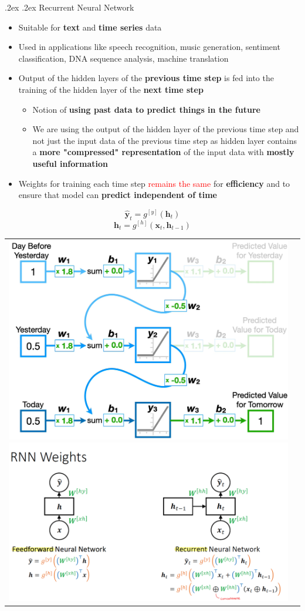 \documentclass[landscape,a4paper]{article}
\makeatletter
\renewcommand{\section}{\@startsection{section}{1}{0mm}%
	{.2ex}%
	{.2ex}%
	{\color{myblue}\sffamily\scriptsize\bfseries}}
\makeatother
\begin{document}
\begin{multicols*}{4}
	\section{Recurrent Neural Network}
	\begin{itemize}
		\item Suitable for \textbf{text} and \textbf{time series} data
		\item Used in applications like speech recognition, music generation, sentiment classification, DNA sequence analysis, machine translation
		\item Output of the hidden layers of the \textbf{previous time step} is fed into the training of the hidden layer of the \textbf{next time step}
		\begin{itemize}
			\item Notion of \textbf{using past data to predict things in the future}
			\item We are using the output of the hidden layer of the previous time step and not just the input data of the previous time step as hidden layer contains a \textbf{more "compressed" representation} of the input data with \textbf{mostly useful information}
		\end{itemize}
		\item Weights for training each time step \textcolor{red}{remains the same} for \textbf{efficiency} and to ensure that model can \textbf{predict independent of time}
	\end{itemize}
	\[\boldsymbol{\hat{y}}_t=g^{[y]}(\boldsymbol{h}_t)\]
	\[\boldsymbol{h}_t=g^{[h]}(\boldsymbol{x}_t,\boldsymbol{h}_{t-1})\]
	\begin{tabular}{c c}
		\includegraphics[width=0.45\linewidth]{rnn}
		\includegraphics[width=0.55\linewidth]{rnn-weights}
	\end{tabular}

\end{multicols*}
\end{document}
